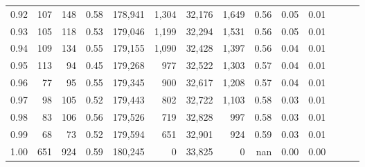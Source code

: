 \begin{tabular}{rrrrrrrrrrrrrr}
0.92 &    107 &  148 &  0.58 &  178,941 &    1,304 &  32,176 &   1,649 &  0.56 &  0.05 &      0.01 \\
0.93 &    105 &  118 &  0.53 &  179,046 &    1,199 &  32,294 &   1,531 &  0.56 &  0.05 &      0.01 \\
0.94 &    109 &  134 &  0.55 &  179,155 &    1,090 &  32,428 &   1,397 &  0.56 &  0.04 &      0.01 \\
0.95 &    113 &   94 &  0.45 &  179,268 &      977 &  32,522 &   1,303 &  0.57 &  0.04 &      0.01 \\
0.96 &     77 &   95 &  0.55 &  179,345 &      900 &  32,617 &   1,208 &  0.57 &  0.04 &      0.01 \\
0.97 &     98 &  105 &  0.52 &  179,443 &      802 &  32,722 &   1,103 &  0.58 &  0.03 &      0.01 \\
0.98 &     83 &  106 &  0.56 &  179,526 &      719 &  32,828 &     997 &  0.58 &  0.03 &      0.01 \\
0.99 &     68 &   73 &  0.52 &  179,594 &      651 &  32,901 &     924 &  0.59 &  0.03 &      0.01 \\
1.00 &    651 &  924 &  0.59 &  180,245 &        0 &  33,825 &       0 &   nan &  0.00 &      0.00 \\
\bottomrule
\end{tabular}
